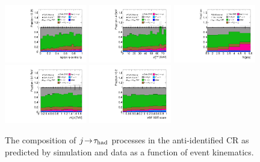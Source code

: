 \begin{figure}[tp]
  \includegraphics[width=0.32\textwidth]{figures/rx/vbf-mvaSR/lep-eta-centrality}
  \includegraphics[width=0.32\textwidth]{figures/rx/vbf-mvaSR/system-pt}
  \includegraphics[width=0.32\textwidth]{figures/rx/vbf-mvaSR/n-jets30}
  \includegraphics[width=0.32\textwidth]{figures/rx/vbf-mvaSR/dijet-m-veryhigh}
  \includegraphics[width=0.32\textwidth]{figures/rx/vbf-mvaSR/BDTEve-VBF}
  \caption{The composition of $j\!\rightarrow\!\tau_\text{had}$ processes in the anti-identified CR as predicted by simulation and data as a function of event kinematics.}
  \label{fig:backgrounds-rx-vbf-jets}
\end{figure}

